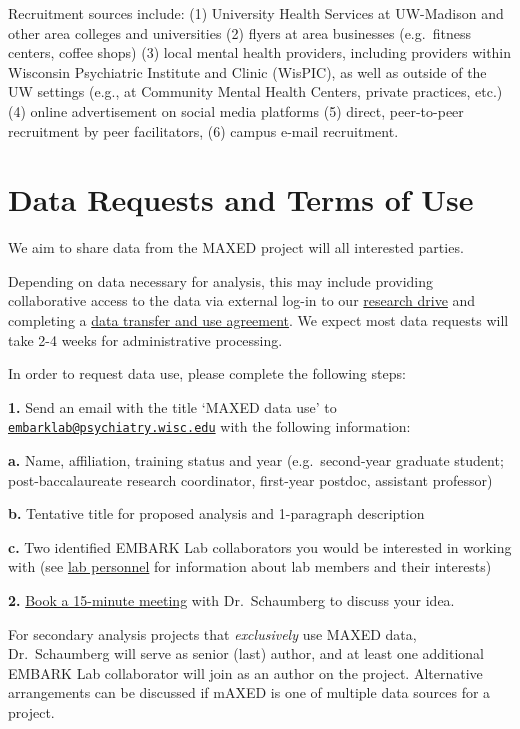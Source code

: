 \documentclass[
]{book}
\begin{document}
Recruitment sources include: (1) University Health Services at UW-Madison and other area colleges and universities (2) flyers at area businesses (e.g.~fitness centers, coffee shops) (3) local mental health providers, including providers within Wisconsin Psychiatric Institute and Clinic (WisPIC), as well as outside of the UW settings (e.g., at Community Mental Health Centers, private practices, etc.) (4) online advertisement on social media platforms (5) direct, peer-to-peer recruitment by peer facilitators, (6) campus e-mail recruitment.

\chapter{Data Requests and Terms of Use}\label{data-requests-and-terms-of-use}

We aim to share data from the MAXED project will all interested parties.

Depending on data necessary for analysis, this may include providing collaborative access to the data via external log-in to our \href{https://kb.wisc.edu/researchdata/page.php?id=96642}{research drive} and completing a \href{https://rsp.wisc.edu/contracts/DTUA-De-IdentifiedData.pdf}{data transfer and use agreement}. We expect most data requests will take 2-4 weeks for administrative processing.

In order to request data use, please complete the following steps:

\textbf{1.} Send an email with the title `MAXED data use' to \href{mailto:embarklab@psychiatry.wisc.edu}{\nolinkurl{embarklab@psychiatry.wisc.edu}} with the following information:

\textbf{a.} Name, affiliation, training status and year (e.g.~second-year graduate student; post-baccalaureate research coordinator, first-year postdoc, assistant professor)

\textbf{b.} Tentative title for proposed analysis and 1-paragraph description

\textbf{c.} Two identified EMBARK Lab collaborators you would be interested in working with (see \href{https://embark.psychiatry.wisc.edu/index.php/people/}{lab personnel} for information about lab members and their interests)

\textbf{2.} \href{https://calendly.com/katherine-schaumberg/15min}{Book a 15-minute meeting} with Dr.~Schaumberg to discuss your idea.

For secondary analysis projects that \emph{exclusively} use MAXED data, Dr.~Schaumberg will serve as senior (last) author, and at least one additional EMBARK Lab collaborator will join as an author on the project. Alternative arrangements can be discussed if mAXED is one of multiple data sources for a project.

  
\end{document}
